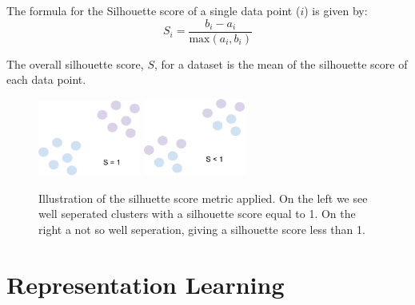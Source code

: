 The formula for the Silhouette score of a single data point ($i$) is given by:
\begin{equation}
    S_i = \frac{b_i-a_i}{\text{max}(a_i, b_i)}
\end{equation}

The overall silhouette score, $S$, for a dataset is the mean of the silhouette score of each data point.
\begin{figure}[H]
    \centering
    \includegraphics[width=0.3\textwidth]{figures/figure-pdf/Shigh.pdf}
    \hspace{1cm}
    \includegraphics[width=0.3\textwidth]{figures/figure-pdf/Slow.pdf}
    \caption{Illustration of the silhuette score metric applied. On the left we see well seperated clusters with a silhouette score equal to 1. On the right a not so well seperation, giving a silhouette score less than 1.}
    \label{fig:knn}
\end{figure}

\section{Representation Learning}

